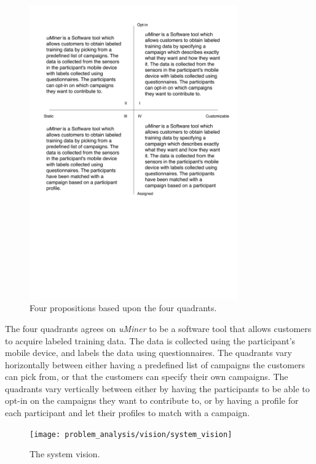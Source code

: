 \begin{figure}[!htbp]
	\centering
	\includegraphics[width=0.8\textwidth]{graphic/problem_analysis/vision/propositions.pdf}
	\caption{Four propositions based upon the four quadrants.}
	\label{fig:proposition}
\end{figure}
\FloatBarrier

The four quadrants agrees on \emph{uMiner} to be a software tool that allows customers to acquire labeled training data. The data is collected using the participant's mobile device, and labels the data using questionnaires. The quadrants vary horizontally between either having a predefined list of campaigns the customers can pick from, or that the customers can specify their own campaigns. The quadrants vary vertically between either by having the participants to be able to opt-in on the campaigns they want to contribute to, or by having a profile for each participant and let their profiles to match with a campaign.

\begin{figure}[!htbp]
    \centering
    \texttt{[image: problem\_analysis/vision/system\_vision]}
    \caption{The system vision.}
    \label{fig:system_vision}
\end{figure}
\FloatBarrier